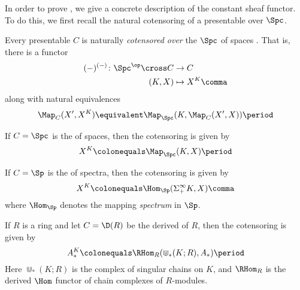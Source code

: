 In order to prove , we give a concrete description of the constant sheaf functor. 
To do this, we first recall the natural cotensoring of a presentable \category over $ \Spc $.

\begin{recollection}\label{rec:cotensoring}
	Every presentable \category $ C $ is naturally \textit{cotensored over} the \category $ \Spc $ of spaces .
	That is, there is a functor 
	\begin{align*}
		(-)^{(-)} \colon \Spc^{\op} \cross C &\to C \\
		(K,X) &\mapsto X^K \comma
	\end{align*}
	along with natural equivalences
	\begin{equation*}
		\Map_{C}(X',X^K) \equivalent \Map_{\Spc}(K,\Map_C(X',X)) \period
	\end{equation*}
\end{recollection}

\begin{example}
	If $ C = \Spc $ is the \category of spaces, then the cotensoring is given by
	\begin{equation*}
		X^K \colonequals \Map_{\Spc}(K,X) \period
	\end{equation*}
\end{example}

\begin{example}\label{ex:Sptcotensor}
	If $ C = \Sp $ is the \category of spectra, then the cotensoring is given by
	\begin{equation*}
		X^K \colonequals \Hom_{\Sp}(\Sigma_+^\infty K,X) \comma
	\end{equation*}
	where $ \Hom_{\Sp} $ denotes the mapping \textit{spectrum} in $ \Sp $.
\end{example}

\begin{example}
	If $ R $ is a ring and let $ C = \D(R) $ be the derived \category of $ R $, then the cotensoring is given by
	\begin{equation*}
		A_{*}^K \colonequals \RHom_{R}(\Cup_*(K;R),A_{*}) \period
	\end{equation*}
	Here $ \Cup_*(K;R) $ is the complex of singular chains on $ K $, and $ \RHom_{R} $ is the derived $ \Hom $
	functor of chain complexes of $ R $-modules.
\end{example}


